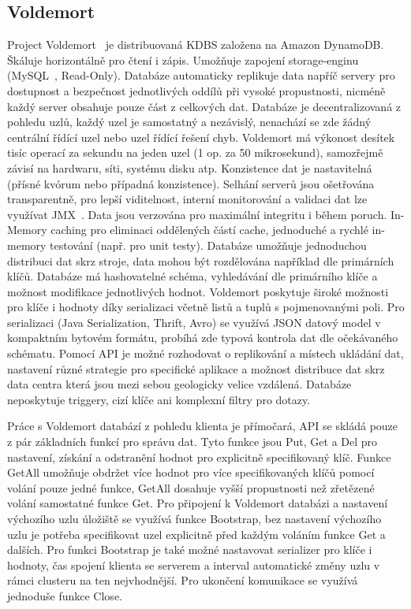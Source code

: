 \documentclass[czech,master,dept460,male,csharp,cpdeclaration]{diploma}
\begin{document}
	\subsection{Voldemort}
	
	Project Voldemort~\cite{voldemort} je distribuovaná KDBS založena na Amazon DynamoDB. Škáluje horizontálně pro čtení i zápis. Umožňuje zapojení storage-enginu (MySQL~\cite{mysql}, Read-Only). Databáze automaticky replikuje data napříč servery pro dostupnost a bezpečnost jednotlivých oddílů při vysoké propustnosti, nicméně každý server obsahuje pouze část z celkových dat. Databáze je decentralizovaná z pohledu uzlů, každý uzel je samostatný a nezávislý, nenachází se zde žádný centrální řídící uzel nebo uzel řídící řešení chyb. Voldemort má výkonost desítek tisíc operací za sekundu na jeden uzel (1 op. za 50 mikrosekund), samozřejmě závisí na hardwaru, síti, systému disku atp. Konzistence dat je nastavitelná (přísné kvórum nebo případná konzistence). Selhání serverů jsou ošetřována transparentně, pro lepší viditelnost, interní monitorování a validaci dat lze využívat JMX~\cite{jmx}. Data jsou verzována pro maximální integritu i během poruch. In-Memory caching pro eliminaci oddělených částí cache, jednoduché a rychlé in-memory testování (např. pro unit testy). Databáze umožňuje jednoduchou distribuci dat skrz stroje, data mohou být rozdělována například dle primárních klíčů. Databáze má hashovatelné schéma, vyhledávání dle primárního klíče a možnost modifikace jednotlivých hodnot. Voldemort poskytuje široké možnosti pro klíče i hodnoty díky serializaci včetně listů a tuplů s pojmenovanými poli. Pro serializaci (Java Serialization, Thrift, Avro) se využívá JSON datový model v kompaktním bytovém formátu, probíhá zde typová kontrola dat dle očekávaného schématu. Pomocí API je možné rozhodovat o replikování a místech ukládání dat, nastavení různé strategie pro specifické aplikace a možnost distribuce dat skrz data centra která jsou mezi sebou geologicky velice vzdálená. Databáze neposkytuje triggery, cizí klíče ani komplexní filtry pro dotazy.
	
	Práce s Voldemort databází z pohledu klienta je přímočará, API se skládá pouze z pár základních funkcí pro správu dat. Tyto funkce jsou Put, Get a Del pro nastavení, získání a odstranění hodnot pro explicitně specifikovaný klíč. Funkce GetAll umožňuje obdržet více hodnot pro více specifikovaných klíčů pomocí volání pouze jedné funkce, GetAll dosahuje vyšší propustnosti než zřetězené volání samostatné funkce Get. Pro připojení k Voldemort databázi a nastavení výchozího uzlu úložiště se využívá funkce Bootstrap, bez nastavení výchozího uzlu je potřeba specifikovat uzel explicitně před každým voláním funkce Get a dalších. Pro funkci Bootstrap je také možné nastavovat serializer pro klíče i hodnoty, čas spojení klienta se serverem a interval automatické změny uzlu v rámci clusteru na ten nejvhodnější. Pro ukončení komunikace se využívá jednoduše funkce Close.
	
\end{document}
